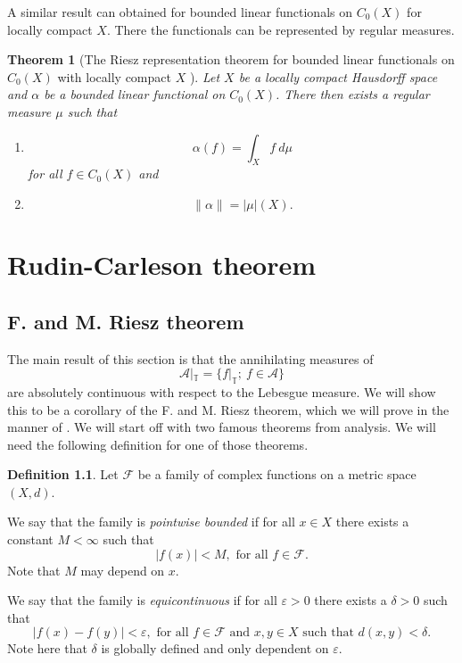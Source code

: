 \documentclass[a4paper,12pt,twoside,BCOR=10mm]{scrbook}
\newtheorem{theorem}{Theorem}[section]
\theoremstyle{definition}
\theoremstyle{definition}
\theoremstyle{definition}
\newtheorem{definition}[theorem]{Definition}
\begin{document}
A similar result can obtained for bounded linear functionals on $C_0(X)$ for locally compact $X$.
There the functionals can be represented by regular measures.
\begin{theorem}[The Riesz representation theorem for bounded linear functionals on $C_0(X)$ with locally compact $X$ \citep{rudin2}]
\label{riesz}
Let $X$ be a locally compact Hausdorff space and $\alpha$ be a bounded linear functional on $C_0(X)$.
There then exists a regular measure $\mu$ such that
\begin{enumerate}
\item[\emph{(i)}]
\[
	\alpha(f) = \int_X f\ d\mu
\]
for all $f \in C_0(X)$ and
\item[\emph{(ii)}]
\[
	\|\alpha\| = |\mu|(X).
\]
\end{enumerate}
\end{theorem}




\chapter{Rudin-Carleson theorem}
\section{F. and M. Riesz theorem}
\label{section1}
The main result of this section is that the annihilating measures of 
\[
	\mathcal{A}|_{\mathbb{T}} = \{f|_{\mathbb{T}};\ f \in \mathcal{A}\}
\]
are absolutely continuous with respect to the Lebesgue measure.
We will show this to be a corollary of the F. and M. Riesz theorem, which we will prove in the manner of \citep{rudin2}.
We will start off with two famous theorems from analysis. 
We will need the following definition for one of those theorems.
\begin{definition}
Let $\mathcal{F}$ be a family of complex functions on a metric space $(X, d)$.

We say that the family is \emph{pointwise bounded} if for all $x \in X$ there exists a constant $M < \infty$ such that
\[
	|f(x)| < M,\text{ for all } f \in \mathcal{F}.
\]
Note that $M$ may depend on $x$.

We say that the family is \emph{equicontinuous} if for all $\varepsilon > 0$ there exists a $\delta > 0$ such that
\[
	|f(x) - f(y)| < \varepsilon,\text{ for all } f \in \mathcal{F}\text{ and } x, y \in X\text{ such that } d(x, y) < \delta.
\]
Note here that $\delta$ is globally defined and only dependent on $\varepsilon$.
\end{definition}
\end{document}
